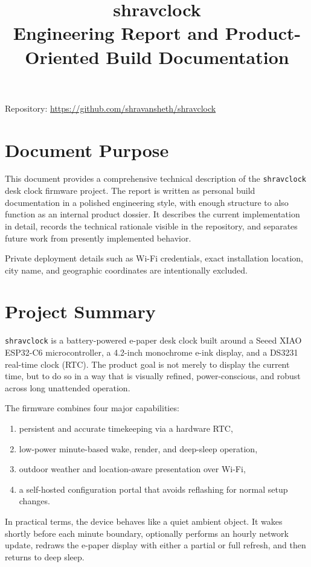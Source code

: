 \documentclass[11pt]{article}
\title{
  \vspace{-1.5em}
  \textbf{shravclock}\\
  \large Engineering Report and Product-Oriented Build Documentation
}
\author{}
\date{\reportdate}
\newcommand{\repo}{\url{https://github.com/shravansheth/shravclock}}
\begin{document}
\maketitle

\begin{center}
\small Repository: \repo
\end{center}

\section{Document Purpose}
This document provides a comprehensive technical description of the \texttt{shravclock} desk clock firmware project. The report is written as personal build documentation in a polished engineering style, with enough structure to also function as an internal product dossier. It describes the current implementation in detail, records the technical rationale visible in the repository, and separates future work from presently implemented behavior.

Private deployment details such as Wi-Fi credentials, exact installation location, city name, and geographic coordinates are intentionally excluded.

\section{Project Summary}
\texttt{shravclock} is a battery-powered e-paper desk clock built around a Seeed XIAO ESP32-C6 microcontroller, a 4.2-inch monochrome e-ink display, and a DS3231 real-time clock (RTC). The product goal is not merely to display the current time, but to do so in a way that is visually refined, power-conscious, and robust across long unattended operation.

The firmware combines four major capabilities:
\begin{enumerate}
  \item persistent and accurate timekeeping via a hardware RTC,
  \item low-power minute-based wake, render, and deep-sleep operation,
  \item outdoor weather and location-aware presentation over Wi-Fi,
  \item a self-hosted configuration portal that avoids reflashing for normal setup changes.
\end{enumerate}

In practical terms, the device behaves like a quiet ambient object. It wakes shortly before each minute boundary, optionally performs an hourly network update, redraws the e-paper display with either a partial or full refresh, and then returns to deep sleep.
\end{document}
